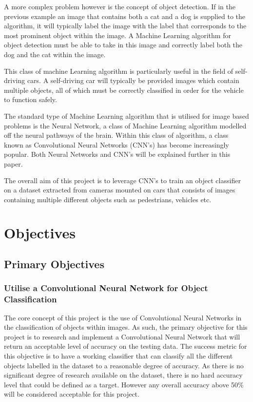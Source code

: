 \documentclass[12pt]{report}
\begin{document}
\begin{flushleft}
A more complex problem however is the concept of object detection. If in the previous example an image that contains both a cat and a dog is supplied to the algorithm, it will typically label the image with the label that corresponds to the most prominent object within the image. A Machine Learning algorithm for object detection must be able to take in this image and correctly label both the dog and the cat within the image.
\end{flushleft}

\begin{flushleft}
This class of machine Learning algorithm is particularly useful in the field of self-driving cars. A self-driving car will typically be provided images which contain multiple objects, all of which must be correctly classified in order for the vehicle to function safely.
\end{flushleft}

\begin{flushleft}
The standard type of Machine Learning algorithm that is utilised for image based problems is the Neural Network, a class of Machine Learning algorithm modelled off the neural pathways of the brain. Within this class of algorithm, a class known as Convolutional Neural Networks (CNN's) has become increasingly popular. Both Neural Networks and CNN's will be explained further in this paper.
\end{flushleft}

\begin{flushleft}
The overall aim of this project is to leverage CNN's to train an object classifier on a dataset extracted from cameras mounted on cars that consists of images containing multiple different objects such as pedestrians, vehicles etc.
\end{flushleft}

\section{Objectives}
\vspace{0.5cm}
\subsection{Primary Objectives}
\subsubsection{Utilise a Convolutional Neural Network for Object Classification}
The core concept of this project is the use of Convolutional Neural Networks in the classification of objects within images. As such, the primary objective for this project is to research and implement a Convolutional Neural Network that will return an acceptable level of accuracy on the testing data. The success metric for this objective is to have a working classifier that can classify all the different objects labelled in the dataset to a reasonable degree of accuracy. As there is no significant degree of research available on the dataset, there is no hard accuracy level that could be defined as a target. However any overall accuracy above 50\% will be considered acceptable for this project.
\end{document}
